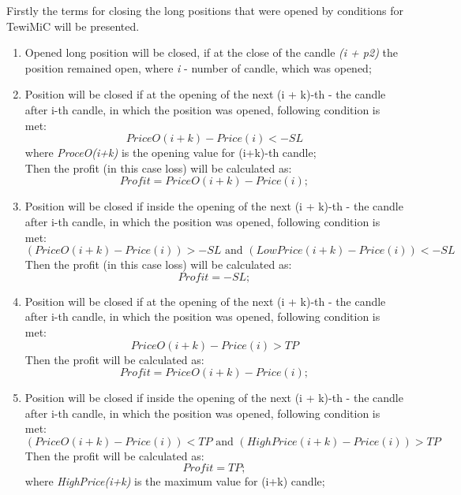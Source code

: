 \documentclass{tewiart}
\begin{document}
Firstly the terms for closing the long positions that were opened by conditions for TewiMiC will be presented.
\begin{enumerate}
\item Opened long position will be closed, if at the close of the candle \textit{(i + p2)} the position remained open, where \textit{i} - number of candle, which was opened;

\item Position will be closed if at the opening of the next (i + k)-th - the candle after i-th candle, in which the position was opened, following condition is met: 
\begin{equation}
PriceO(i+k)-Price(i) <-SL
\end{equation} 
where \textit{ProceO(i+k)} is the opening value for (i+k)-th candle;\\
Then the profit (in this case loss) will be calculated as:
\begin{equation}
Profit =PriceO (i+k)-Price(i);
\end{equation}

\item Position will be closed if inside the opening of the next (i + k)-th - the candle after i-th candle, in which the position was opened, following condition is met: 
\begin{equation}
(PriceO(i+k)-Price(i) )>-SL \text{ and } (LowPrice(i+k)-Price(i))<-SL
\end{equation} 
Then the profit (in this case loss) will be calculated as:
\begin{equation}
Profit =-SL;
\end{equation}

\item Position will be closed if at the opening of the next (i + k)-th - the candle after i-th candle, in which the position was opened, following condition is met: 
\begin{equation}
PriceO(i+k)-Price(i)>TP
\end{equation} 
Then the profit will be calculated as:
\begin{equation}
Profit =PriceO (i+k)-Price(i);
\end{equation}

\item Position will be closed if inside the opening of the next (i + k)-th - the candle after i-th candle, in which the position was opened, following condition is met: 
\begin{equation}
(PriceO(i+k)-Price(i) )<TP \text{ and } (HighPrice(i+k)-Price(i))>TP
\end{equation} 
Then the profit will be calculated as:
\begin{equation}
Profit =TP;
\end{equation}
where \textit{HighPrice(i+k)} is the maximum value for (i+k) candle;


\end{enumerate}
\end{document}
